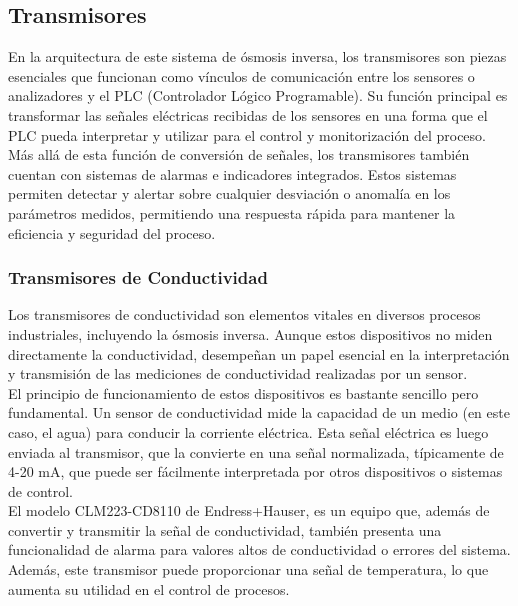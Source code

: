 
\subsection{Transmisores}

En la arquitectura de este sistema de ósmosis inversa, los transmisores son piezas esenciales que funcionan como vínculos de
comunicación entre los sensores o analizadores y el PLC (Controlador Lógico Programable). 
Su función principal es transformar las señales eléctricas recibidas de los sensores en una forma que el 
PLC pueda interpretar y utilizar para el control y monitorización del proceso. \\

Más allá de esta función de conversión de señales, los transmisores también cuentan con sistemas de alarmas e indicadores 
integrados. Estos sistemas permiten detectar y alertar sobre cualquier desviación o
anomalía en los parámetros medidos, permitiendo una respuesta rápida para mantener la eficiencia y seguridad del proceso. \\

\subsubsection{Transmisores de Conductividad } \label{sec:transmisor_conductividad}

Los transmisores de conductividad son elementos vitales en diversos procesos industriales, incluyendo la ósmosis inversa. Aunque estos dispositivos no miden directamente la conductividad, desempeñan un papel esencial en la interpretación y transmisión de las mediciones de conductividad realizadas por un sensor.\\

El principio de funcionamiento de estos dispositivos es bastante sencillo pero fundamental. Un sensor de conductividad mide la capacidad de un medio (en este caso, el agua) para conducir la corriente eléctrica. Esta señal eléctrica es luego enviada al transmisor, que la convierte en una señal normalizada, típicamente de 4-20 mA, que puede ser fácilmente interpretada por otros dispositivos o sistemas de control.\\

El modelo CLM223-CD8110 de Endress+Hauser, es un equipo que, además de convertir y transmitir la señal de conductividad, también presenta una funcionalidad de alarma para valores altos de conductividad o errores del sistema. Además, este transmisor puede proporcionar una señal de temperatura, lo que aumenta su utilidad en el control de procesos.\\

